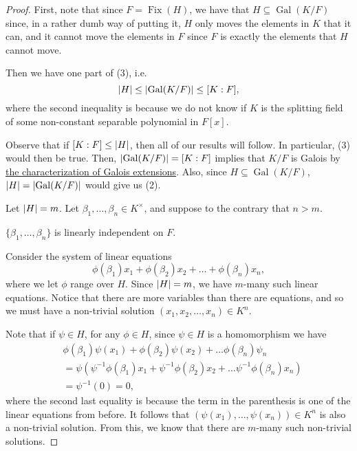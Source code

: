 \documentclass[notoc,notitlepage,nobib]{tufte-book}
\DeclareMathOperator{\Gal}{Gal}
\DeclareMathOperator{\Fix}{Fix}
\begin{document}
\begin{proof}
  First, note that since $F = \Fix(H)$, we have that $H \subseteq \Gal(K / F)$ 
  since, in a rather dumb way of putting it, $H$ only moves the elements in $K$ 
  that it can, and it cannot move the elements in $F$ since $F$ is exactly the
  elements that $H$ cannot move.

  Then we have one part of (3), i.e.
  \begin{equation*}
    \abs{H} \leq \abs{\Gal(K / F)} \leq [K : F],
  \end{equation*}
  where the second inequality is because we do not know if $K$ is the splitting
  field of some non-constant separable polynomial in $F[x]$.

  Observe that if $[K : F] \leq \left|H\right|$, then all of our results will follow.
  In particular, (3) would then be true. Then, $\abs{\Gal(K / F)} = [K : F]$
  implies that $K / F$ is Galois by
  \hyperref[thm:characterization_of_galois_extensions]{the characterization of
  Galois extensions}. Also, since $H \subseteq \Gal(K / F)$, $\abs{H} =
  \abs{\Gal(K / F)}$ would give us (2).

  Let $\left|H\right| = m$. Let $\beta_1, \ldots, \beta_n \in K^\times$, and suppose to
  the contrary that $n > m$.
  
  \noindent
   $\{\beta_1, \ldots, \beta_n\}$ is linearly independent on
  $F$.

  Consider the system of linear equations
  \begin{equation*}
    \phi(\beta_1) x_1 + \phi(\beta_2) x_2 + \hdots + \phi(\beta_n) x_n,
  \end{equation*}
  where we let $\phi$ range over $H$. Since $\left|H\right| = m$, we have $m$-many such
  linear equations. Notice that there are more variables than there are
  equations, and so we must have a non-trivial solution $(x_1, x_2, \ldots, x_n)
  \in K^n$.

  Note that if $\psi \in H$, for any $\phi \in H$, since $\psi \in H$ is a
  homomorphism we have
  \begin{align*}
    &\phi(\beta_1) \psi(x_1) + \phi(\beta_2) \psi(x_2) + \hdots \phi(\beta_n)
      \psi_n \\
    &= \psi\left(\psi^{-1} \phi(\beta_1) x_1 + \psi^{-1} \phi(\beta_2) x_2 +
      \hdots \psi^{-1} \phi(\beta_n) x_n\right) \\
    &= \psi^{-1}(0) = 0,
  \end{align*}
  where the second last equality is because the term in the parenthesis is one
  of the linear equations from before. It follows that $(\psi(x_1), \ldots,
  \psi(x_n)) \in K^n$ is also a non-trivial solution. From this, we know that
  there are $m$-many such non-trivial solutions.


\end{proof}
\end{document}
